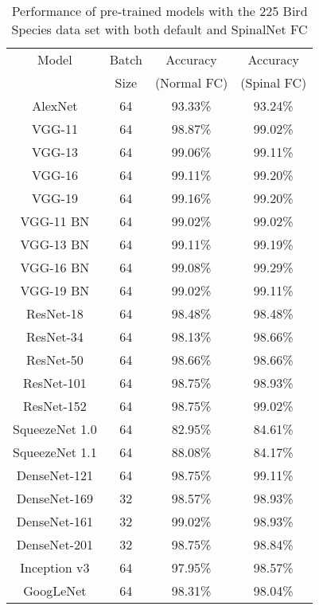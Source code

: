 \documentclass[conference]{IEEEtran}
\begin{document}
\begin{table}
		\caption{Performance of pre-trained models with the 225 Bird Species data set with both default and SpinalNet FC}
		\label{Bird_Results} \centering
\begin{tabular}{|c|c|c|c|}	\hline 

    Model & Batch   & Accuracy    & Accuracy       \\ 
          & Size    & (Normal FC) & (Spinal FC)    \\
    
    \hline AlexNet & 64 &   93.33\%    & 93.24\%   \\      
    \hline VGG-11  & 64 &   98.87\%    & 99.02\%   \\ 
    \hline VGG-13  & 64 &   99.06\%    & 99.11\%   \\
    \hline VGG-16  & 64 &   99.11\%    & 99.20\%   \\
    \hline VGG-19  & 64 &   99.16\%    & 99.20\%   \\
    \hline VGG-11 BN    & 64   & 99.02\% & 99.02\% \\
    \hline VGG-13 BN    & 64   & 99.11\% & 99.19\% \\
    \hline VGG-16 BN    & 64   & 99.08\% & 99.29\% \\
    \hline VGG-19 BN    & 64   & 99.02\% & 99.11\% \\
    \hline ResNet-18    & 64   & 98.48\% & 98.48\% \\
    \hline ResNet-34    & 64   & 98.13\% & 98.66\% \\
    \hline ResNet-50    & 64   & 98.66\% & 98.66\% \\
    \hline ResNet-101   & 64   & 98.75\% & 98.93\% \\
    \hline ResNet-152   & 64   & 98.75\% & 99.02\% \\
    \hline SqueezeNet 1.0 & 64 & 82.95\% & 84.61\% \\    
    \hline SqueezeNet 1.1 & 64 & 88.08\% & 84.17\% \\
    \hline DenseNet-121 & 64   & 98.75\% & 99.11\% \\
    \hline DenseNet-169 & 32   & 98.57\% & 98.93\%  \\
    \hline DenseNet-161 & 32   & 99.02\% & 98.93\% \\ 
    \hline DenseNet-201 & 32   & 98.75\% & 98.84\% \\
    \hline Inception v3 & 64   & 97.95\% & 98.57\% \\
    \hline GoogLeNet    & 64   & 98.31\% & 98.04\% \\

\end{tabular}
\end{table}
\end{document}
